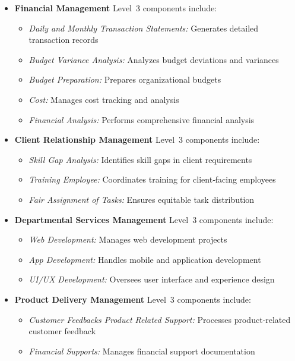 \documentclass[12pt,a4paper]{article}
\begin{document}
\begin{itemize}
    \item \textbf{Financial Management} Level~3 components include:
    \begin{itemize}
        \item \textit{Daily and Monthly Transaction Statements:} Generates detailed transaction records
        \item \textit{Budget Variance Analysis:} Analyzes budget deviations and variances
        \item \textit{Budget Preparation:} Prepares organizational budgets
        \item \textit{Cost:} Manages cost tracking and analysis
        \item \textit{Financial Analysis:} Performs comprehensive financial analysis
    \end{itemize}
    
    \item \textbf{Client Relationship Management} Level~3 components include:
    \begin{itemize}
        \item \textit{Skill Gap Analysis:} Identifies skill gaps in client requirements
        \item \textit{Training Employee:} Coordinates training for client‑facing employees
        \item \textit{Fair Assignment of Tasks:} Ensures equitable task distribution
    \end{itemize}
    
    \item \textbf{Departmental Services Management} Level~3 components include:
    \begin{itemize}
        \item \textit{Web Development:} Manages web development projects
        \item \textit{App Development:} Handles mobile and application development
        \item \textit{UI/UX Development:} Oversees user interface and experience design
    \end{itemize}
    
    \item \textbf{Product Delivery Management} Level~3 components include:
    \begin{itemize}
        \item \textit{Customer Feedbacks Product Related Support:} Processes product‑related customer feedback
        \item \textit{Financial Supports:} Manages financial support documentation
    \end{itemize}
\end{itemize}
\end{document}

